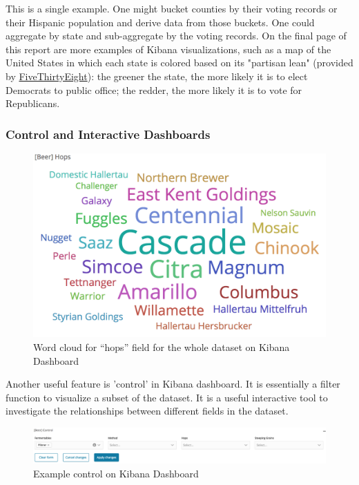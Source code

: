 \documentclass[bibliography=totoc]{article}
\begin{document}
This is a single example. One might bucket counties by their voting records or their Hispanic population and
derive data from those buckets. One could aggregate by state and sub-aggregate by the voting records. On the
final page of this report are more examples of Kibana visualizations, such as a map of the United States
in which each state is colored based on its "partisan lean" (provided by \href{https://github.com/fivethirtyeight/data/blob/master/partisan-lean/fivethirtyeight_partisan_lean_STATES.csv}{FiveThirtyEight}):
the greener the state, the more likely it is to elect Democrats to public office; the redder, the more likely
it is to vote for Republicans.

\subsubsection{Control and Interactive Dashboards}
\begin{figure}[!hb]
  \centering
  \includegraphics[width=\linewidth]{beer_hops.png}
 \caption{Word cloud for ``hops'' field for the whole dataset on Kibana Dashboard}
  \label{fig:beer_hops}
\end{figure}

Another useful feature is 'control' in Kibana dashboard. It is essentially a filter function to visualize a subset of the dataset. It is a useful interactive tool to investigate the relationships between different fields in the dataset.

\begin{figure}
  \centering
  \includegraphics[width=\linewidth]{beer_control.png}
 \caption{Example control on Kibana Dashboard}
  \label{fig:beer_control}
\end{figure}
\end{document}
